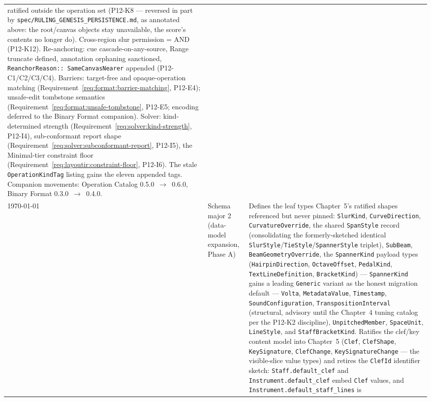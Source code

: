 \documentclass[11pt,letterpaper]{report}
\begin{document}
\begin{longtable}{p{2cm} p{2.5cm} p{9cm}}
  ratified outside the operation set (P12-K8 --- reversed in part by
  \texttt{spec/RULING\_GENESIS\_PERSISTENCE.md}, as annotated above: the
  root/canvas objects stay unavailable, the score's contents no longer do).
  Cross-region slur permission =
  AND (P12-K12). Re-anchoring: cue cascade-on-any-source, Range truncate
  defined, annotation orphaning sanctioned, \texttt{ReanchorReason::
  SameCanvasNearer} appended (P12-C1/C2/C3/C4). Barriers: target-free and
  opaque-operation matching (Requirement~\ref{req:format:barrier-matching},
  P12-E4); unsafe-edit tombstone semantics
  (Requirement~\ref{req:format:unsafe-tombstone}, P12-E5; encoding deferred to
  the Binary Format companion). Solver: kind-determined strength
  (Requirement~\ref{req:solver:kind-strength}, P12-I4), sub-conformant report
  shape (Requirement~\ref{req:solver:subconformant-report}, P12-I5), the
  Minimal-tier constraint floor
  (Requirement~\ref{req:layoutir:constraint-floor}, P12-I6). The stale
  \texttt{OperationKindTag} listing gains the eleven appended tags. Companion
  movements: Operation Catalog 0.5.0~$\rightarrow$~0.6.0, Binary Format
  0.3.0~$\rightarrow$~0.4.0.
  \\
  \today & Schema major 2 (data-model expansion, Phase A) &
  Defines the leaf types Chapter~5's ratified shapes referenced but never
  pinned: \texttt{SlurKind}, \texttt{CurveDirection},
  \texttt{CurvatureOverride}, the shared \texttt{SpanStyle} record
  (consolidating the formerly-sketched identical
  \texttt{SlurStyle}/\texttt{TieStyle}/\texttt{SpannerStyle} triplet),
  \texttt{SubBeam}, \texttt{BeamGeometryOverride}, the
  \texttt{SpannerKind} payload types (\texttt{HairpinDirection},
  \texttt{OctaveOffset}, \texttt{PedalKind}, \texttt{TextLineDefinition},
  \texttt{BracketKind}) --- \texttt{SpannerKind}
  gains a leading \texttt{Generic} variant as the honest migration default
  --- \texttt{Volta}, \texttt{MetadataValue}, \texttt{Timestamp},
  \texttt{SoundConfiguration}, \texttt{TranspositionInterval} (structural,
  advisory until the Chapter~4 tuning catalog per the P12-K2 discipline),
  \texttt{UnpitchedMember}, \texttt{SpaceUnit}, \texttt{LineStyle}, and
  \texttt{StaffBracketKind}. Ratifies the clef/key content model into
  Chapter~5 (\texttt{Clef}, \texttt{ClefShape}, \texttt{KeySignature},
  \texttt{ClefChange}, \texttt{KeySignatureChange} --- the visible-slice
  value types) and retires the \texttt{ClefId} identifier sketch:
  \texttt{Staff.default\_clef} and \texttt{Instrument.default\_clef} embed
  \texttt{Clef} values, and \texttt{Instrument.default\_staff\_lines} is

\end{longtable}
\end{document}
